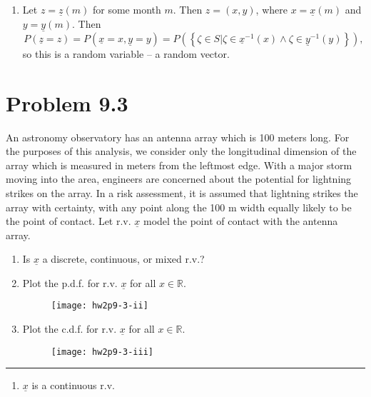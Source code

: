 \documentclass{article}
\newcommand{\horline}
           {\begin{center}
              \noindent\rule{8cm}{0.4pt}
            \end{center}}
\begin{document}
\begin{enumerate}[label=(\alph*)]
{$$\begin{array}{l l}
          \frac{1}{12}, & x = 3,6,9 \\
        \end{array}\right.
        $$
        The c.d.f. is plotted below.
        \begin{figure}
          \centering\texttt{[image: hw2p9-2-b-iii]}
        \end{figure}
        }
  \item{Let $z = \underline{z}(m)$ for some month $m$. Then $z = (x,y)$, 
        where $x = \underline{x}(m)$ and $y = \underline{y}(m)$. Then
        $$
        P(\underline{z} = z) = P(\underline{x} = x, \underline{y} = y)
          = P\left(\left\{\zeta \in S | 
              \zeta \in \underline{x}^{-1}(x) \wedge
              \zeta \in \underline{y}^{-1}(y)\right\}\right),
        $$
        so this is a random variable -- a random vector. 
       }
\end{enumerate}

\section*{Problem 9.3}
An astronomy observatory has an antenna array which is 100 meters long. For
the purposes of this analysis, we consider only the longitudinal dimension
of the array which is measured in meters from the leftmost edge. With a 
major storm moving into the area, engineers are concerned about the 
potential for lightning strikes on the array. In a risk assessment, it is
assumed that lightning strikes the array with certainty, with any point
along the 100 m width equally likely to be the point of contact. Let r.v.
$\underline{x}$ model the point of contact with the antenna array.
\begin{enumerate}[label=(\roman*)]
  \item{Is $\underline{x}$ a discrete, continuous, or mixed r.v.?}
  \item{Plot the p.d.f. for r.v. $\underline{x}$ for all $x \in \mathbb{R}$.
        \begin{figure}
          \centering\texttt{[image: hw2p9-3-ii]}
        \end{figure}
       }
  \item{Plot the c.d.f. for r.v. $\underline{x}$ for all $x \in \mathbb{R}$.
        \begin{figure}
          \centering\texttt{[image: hw2p9-3-iii]}
        \end{figure}
       }
\end{enumerate}
\horline
\begin{enumerate}[label=(\roman*)]
  \item{$\underline{x}$ is a continuous r.v.}
\end{enumerate}
\end{document}

